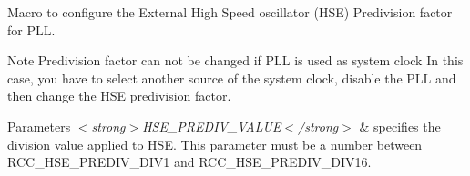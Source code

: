 Macro to configure the External High Speed oscillator (H\+SE) Predivision factor for P\+LL. 

\begin{DoxyNote}{Note}
Predivision factor can not be changed if P\+LL is used as system clock In this case, you have to select another source of the system clock, disable the P\+LL and then change the H\+SE predivision factor. 
\end{DoxyNote}

\begin{DoxyParams}{Parameters}
{\em $<$strong$>$\+H\+S\+E\+\_\+\+P\+R\+E\+D\+I\+V\+\_\+\+V\+A\+L\+U\+E$<$/strong$>$} & specifies the division value applied to H\+SE. This parameter must be a number between R\+C\+C\+\_\+\+H\+S\+E\+\_\+\+P\+R\+E\+D\+I\+V\+\_\+\+D\+I\+V1 and R\+C\+C\+\_\+\+H\+S\+E\+\_\+\+P\+R\+E\+D\+I\+V\+\_\+\+D\+I\+V16. \\
\hline
\end{DoxyParams}

